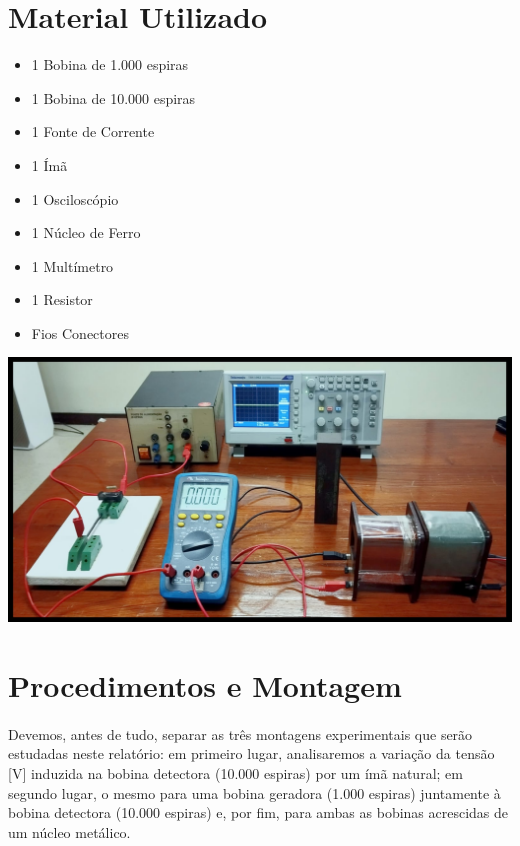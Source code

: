 \documentclass[column,brazilian,12pt,a4paper,final]{article}
\begin{document}
\section{Material Utilizado}
\begin{minipage}{0.5\textwidth}
    \begin{itemize}
        \item 1 Bobina de 1.000 espiras 
        \item 1 Bobina de 10.000 espiras 
        \item 1 Fonte de Corrente
        \item 1 Ímã
        \item 1 Osciloscópio 
        \item 1 Núcleo de Ferro
        \item 1 Multímetro 
        \item 1 Resistor 
        \item Fios Conectores 
    \end{itemize}
\end{minipage}%
\hfill
\begin{minipage}{0.45\textwidth}
    \centering
    \includegraphics[width=1.04\linewidth]{Pasted image.png}
    \label{fig:helmholtz-setup}
\end{minipage}
\newpage
\section{Procedimentos e Montagem}
\paragraph{}
Devemos, antes de tudo, separar as três montagens experimentais que serão estudadas neste relatório: em primeiro lugar, analisaremos a variação da tensão [V] induzida na bobina detectora (10.000 espiras) por um ímã natural; em segundo lugar, o mesmo para uma bobina geradora (1.000 espiras) juntamente à bobina detectora (10.000 espiras) e, por fim, para ambas as bobinas acrescidas de um núcleo metálico. 
\end{document}
